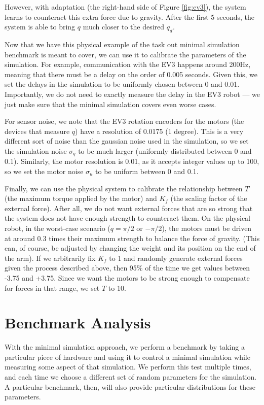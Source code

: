 \documentclass{frontiersSCNS} %
\begin{document}
However, with adaptation (the right-hand side of Figure \ref{fig:ev3}),
the system learns to counteract this extra force due to gravity.  After
the first 5 seconds, the system is able to bring $q$ much closer to the
desired $q_d$.

Now that we have this physical example of the task out minimal simulation
benchmark is meant to cover, we can use it to calibrate the parameters of
the simulation.  For example, communication with the EV3 happens around
200Hz, meaning that there must be a delay on the order of 0.005 seconds.  Given
this, we set the delays in the simulation to be uniformly chosen between
0 and 0.01.  Importantly, we do not need to exactly measure the delay in the
EV3 robot --- we just make sure that the minimal simulation covers even worse
cases.

For sensor noise, we note that the EV3 rotation encoders for the motors (the
devices that measure $q$) have a resolution of 0.0175 (1 degree).  This is a
very different sort of noise than the gaussian noise used in the simulation,
so we set the simulation noise $\sigma_q$ to be much larger (uniformly distributed
between 0 and 0.1).  Similarly, the motor resolution is 0.01, as it accepts 
integer values up to 100, so we set the motor noise $\sigma_u$ to be uniform between
0 and 0.1.

Finally, we can use the physical system to calibrate the relationship between
$T$ (the maximum torque applied by the motor) and $K_f$ (the scaling factor
of the external force).  After all, we do not want external forces that are
so strong that the system does not have enough strength to counteract them.
On the physical robot, in the worst-case scenario ($q=\pi/2$ or $-\pi/2$),
the motors must be driven at around 0.3 times their maximum strength to
balance the force of gravity.  (This can, of course, be adjusted by changing
the weight and its position on the end of the arm).  If we arbitrarily fix $K_f$ to 1 and randomly
generate external forces given the process described above, then 95\% of
the time we get values between -3.75 and +3.75.  Since we want the motors to
be strong enough to compensate for forces in that range, we set $T$ to 10.

\section{Benchmark Analysis}

With the minimal simulation approach, we perform a benchmark by taking a
particular piece of hardware and using it to control a minimal simulation while
measuring some aspect of that simulation.  We perform this test multiple times,
and each time we choose a different set of random parameters for the
simulation.  A particular benchmark, then, will also provide particular
distributions for these parameters.
\end{document}
